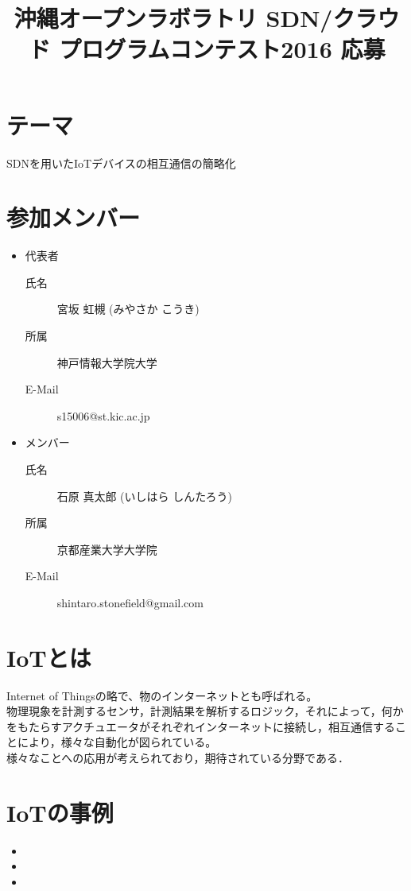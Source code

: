 \documentclass{jsarticle}
\begin{document}
\title{沖縄オープンラボラトリ SDN/クラウド プログラムコンテスト2016 応募}
\maketitle

\section{テーマ}
	SDNを用いたIoTデバイスの相互通信の簡略化

\section{参加メンバー}
\begin{itemize}
	\item 代表者
		\begin{description}
			\item[氏名] 宮坂 虹槻 (みやさか こうき)
			\item[所属] 神戸情報大学院大学
			\item[E-Mail] s15006@st.kic.ac.jp
		\end{description}
	\item メンバー
		\begin{description}
			\item[氏名] 石原 真太郎 (いしはら しんたろう)
			\item[所属] 京都産業大学大学院
			\item[E-Mail] shintaro.stonefield@gmail.com
		\end{description}
\end{itemize}

\section{IoTとは}
	Internet of Thingsの略で、物のインターネットとも呼ばれる。\\
	物理現象を計測するセンサ，計測結果を解析するロジック，それによって，何かをもたらすアクチュエータがそれぞれインターネットに接続し，相互通信することにより，様々な自動化が図られている。\\
	様々なことへの応用が考えられており，期待されている分野である．\\

\section{IoTの事例}
\begin{itemize}
	\item 
	\item 
	\item
\end{itemize}
\end{document}
